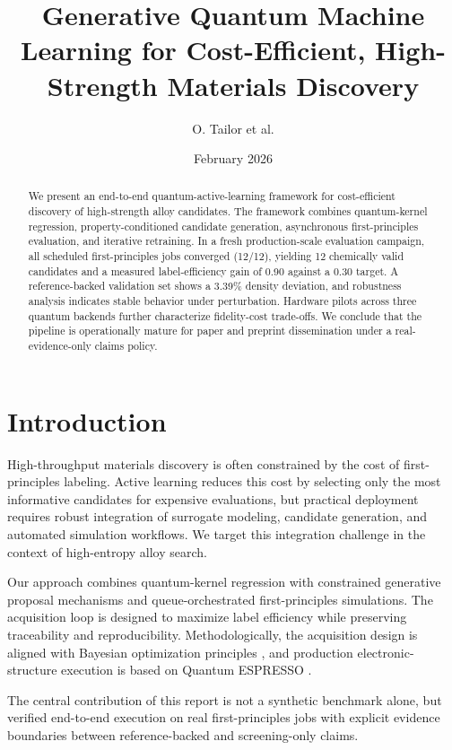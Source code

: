 \documentclass[11pt]{article}
\title{Generative Quantum Machine Learning for Cost-Efficient, High-Strength Materials Discovery}
\author{O. Tailor et al.}
\date{February 2026}
\begin{document}
\maketitle

\begin{abstract}
We present an end-to-end quantum-active-learning framework for cost-efficient discovery of high-strength alloy candidates. The framework combines quantum-kernel regression, property-conditioned candidate generation, asynchronous first-principles evaluation, and iterative retraining. In a fresh production-scale evaluation campaign, all scheduled first-principles jobs converged (12/12), yielding 12 chemically valid candidates and a measured label-efficiency gain of 0.90 against a 0.30 target. A reference-backed validation set shows a 3.39\% density deviation, and robustness analysis indicates stable behavior under perturbation. Hardware pilots across three quantum backends further characterize fidelity-cost trade-offs. We conclude that the pipeline is operationally mature for paper and preprint dissemination under a real-evidence-only claims policy.
\end{abstract}

\section{Introduction}
High-throughput materials discovery is often constrained by the cost of first-principles labeling. Active learning reduces this cost by selecting only the most informative candidates for expensive evaluations, but practical deployment requires robust integration of surrogate modeling, candidate generation, and automated simulation workflows. We target this integration challenge in the context of high-entropy alloy search.

Our approach combines quantum-kernel regression with constrained generative proposal mechanisms and queue-orchestrated first-principles simulations. The acquisition loop is designed to maximize label efficiency while preserving traceability and reproducibility. Methodologically, the acquisition design is aligned with Bayesian optimization principles \cite{brochu2010bo,frazier2018tutorial}, and production electronic-structure execution is based on Quantum ESPRESSO \cite{giannozzi2020qe}.

The central contribution of this report is not a synthetic benchmark alone, but verified end-to-end execution on real first-principles jobs with explicit evidence boundaries between reference-backed and screening-only claims.
\end{document}
